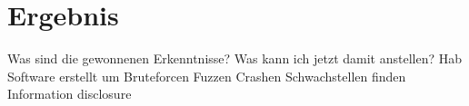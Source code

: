 \chapter{Ergebnis}
Was sind die gewonnenen Erkenntnisse?
Was kann ich jetzt damit anstellen?
Hab Software erstellt um
Bruteforcen
Fuzzen
Crashen
Schwachstellen finden
Information disclosure